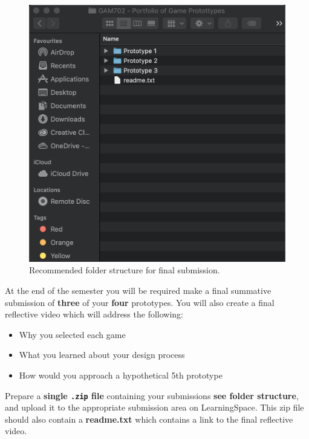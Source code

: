 \documentclass{../../fal_assignment}
\begin{document}
\begin{figure}[H]
	\begin{center}
		\includegraphics[height=0.4\textheight]{portfolio_folder_structure}
	\end{center}
	\caption{Recommended folder structure for final submission.}
	\label{fig:portfolio_folder_structure}
\end{figure}

At the end of the semester you will be required make a final summative submission of \textbf{three} of your \textbf{four} prototypes. You will also create a final reflective video which will address the following:

\begin{itemize}
	\item Why you selected each game
	\item What you learned about your design process
	\item How would you approach a hypothetical 5th prototype
\end{itemize}

Prepare a \textbf{single \texttt{.zip} file} containing your submissions \textbf{see folder structure}, and upload it to the appropriate submission area on LearningSpace. This zip file should also contain a \textbf{readme.txt} which contains a link to the final reflective video.
\end{document}
